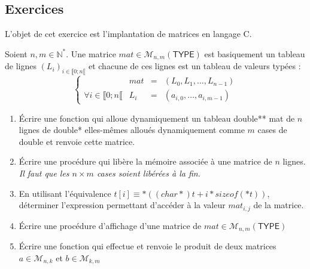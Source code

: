 \documentclass[../../../main.tex]{subfiles}
\begin{document}
\subsection{Exercices}
 L'objet de cet exercice est l'implantation de matrices en langage C. 

Soient $n, m\in\mathbb{N}^{*}$. Une matrice $mat\in\mathcal{M}_{n, m}(\textsf{TYPE})$ est basiquement un tableau de lignes $(L_{i})_{i\in{\llbracket{0; n\llbracket}}}$ et chacune de ces lignes est un tableau de valeurs typées :
$$\left\{ \begin{array}{llcl}
& mat & = & \left( L_{0}, L_{1}, \dots, L_{n-1} \right) \\
\forall i \in \llbracket0; n\llbracket & L_{i} & = & \left(a_{i, 0}, \dots, a_{i, m-1} \right)
\end{array}\right.$$
\begin{enumerate}
	\item Écrire une fonction \textsf{} qui alloue dynamiquement un tableau \textsf{double** mat} de $n$ lignes de \textsf{double*} elles-mêmes alloués dynamiquement comme $m$ cases de \textsf{double} et renvoie cette matrice.
	\item Écrire une procédure \textsf{} qui libère la mémoire associée à une matrice de $n$ lignes. \textit{Il faut que les $n\times{m}$ cases soient libérées à la fin.}
	\item En utilisant l'équivalence $t[i] \equiv *((char*)t + i*sizeof(*t))$, déterminer l'expression permettant d'accéder à la valeur $mat_{i, j}$ de la matrice.
	\item Écrire une procédure d'affichage d'une matrice de $mat\in\mathcal{M}_{n, m}(\textsf{TYPE})$ \textsf{}
	\item Écrire une fonction \textsf{} qui effectue et renvoie le produit de deux matrices $a\in\mathcal{M}_{n, k}$ et $b\in\mathcal{M}_{k, m}$
\end{enumerate}
\end{document}
